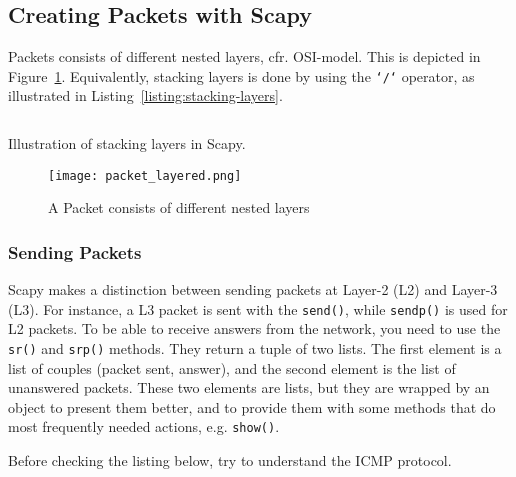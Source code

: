 \documentclass[11pt,a4paper]{article}
\begin{document}
\subsection{Creating Packets with Scapy}
Packets consists of different nested layers, cfr. OSI-model. This is depicted in Figure~\ref{fig:nested_layers_packet}. Equivalently, stacking layers is done by using the \texttt{`/`} operator, as illustrated in Listing~\ref{listing:stacking-layers}.

\begin{listing}[h]
\inputminted{python}{../code_students/example_stacking_layers.py}
\caption{Illustration of stacking layers in Scapy.}%
\label{listing:stacking-layers}
\end{listing}



\begin{figure}
    \centering
    \texttt{[image: packet\_layered.png]}
    \caption{A Packet consists of different nested layers}%
    \label{fig:nested_layers_packet}
\end{figure}


 \subsubsection{Sending Packets}
 Scapy makes a distinction between sending packets at Layer-2 (L2) and Layer-3 (L3). For instance, a L3 packet is sent with the \texttt{send()}, while \texttt{sendp()} is used for L2 packets. To be able to receive answers from the network, you need to use the \texttt{sr()} and \texttt{srp()} methods. They return a tuple of two lists. The first element is a list of couples (packet sent, answer), and the second element is the list of unanswered packets. These two elements are lists, but they are wrapped by an object to present them better, and to provide them with some methods that do most frequently needed actions, e.g. \texttt{show()}.
 
 \begin{info}
     Before checking the listing below, try to understand the ICMP protocol.
 \end{info}
\end{document}
